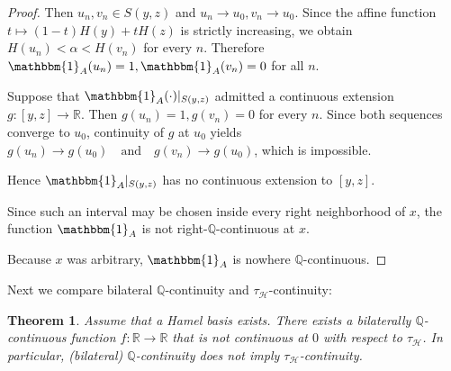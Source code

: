 \documentclass[11pt]{amsart} %
\newtheorem{theorem}{Theorem}[section]
\theoremstyle{definition}
\newcommand{\Q}{\mathbb{Q}}
\newcommand{\AD}{\mathcal{H}}
\begin{document}
\begin{proof}
Then $u_n,v_n\in S(y,z)$ and
$u_n\to u_0,
v_n\to u_0.$ Since the affine function
$
t\mapsto (1-t)H(y)+tH(z)$ is strictly increasing, we obtain $H(u_n)<\alpha<H(v_n)$ for every $n$. Therefore $\mathbbm{1}_A(u_n)=1,
\mathbbm{1}_A(v_n)=0$ for all $n$.

Suppose that $\mathbbm{1}_A(\cdot) |_{S(y,z)}$ admitted a continuous extension $g:[y,z]\to\mathbb{R}$. Then $g(u_n)=1,
g(v_n)=0$ 
for every $n$. Since both sequences converge to $u_0$, continuity of $g$ at $u_0$ yields $
g(u_n)\to g(u_0)
\quad\text{and}\quad
g(v_n)\to g(u_0)$, which is impossible.

Hence $\mathbbm{1}_A|_{S(y,z)}$ has no continuous extension to $[y,z]$.

Since such an interval may be chosen inside every right neighborhood of $x$, the function $\mathbbm{1}_A$ is not right-$\Q$-continuous at $x$.

Because $x$ was arbitrary, $\mathbbm{1}_A$ is nowhere $\Q$-continuous.
\end{proof}

Next we compare bilateral $\mathbb{Q}$-continuity and  $\tau_{\AD}$-continuity:

\begin{theorem}
\label{thm:5.7}
Assume that a Hamel basis exists.  
There exists a bilaterally $\mathbb{Q}$-continuous function $f:\mathbb{R}\rightarrow\mathbb{R}$ that is not continuous at $0$ with respect to $\tau_{\AD}$. In particular, (bilateral) $\mathbb{Q}$-continuity does not imply $\tau_{\AD}$-continuity.
\end{theorem}
\end{document}
